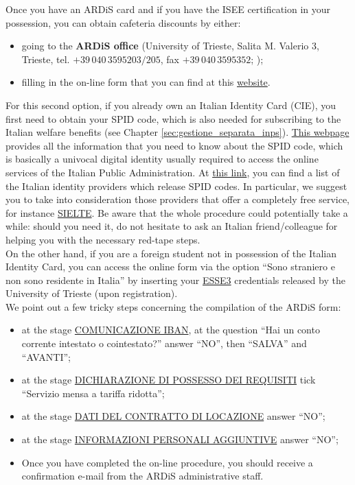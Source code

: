 \documentclass{sissavademecum}
\begin{document}
Once you have an ARDiS card and if you have the ISEE certification in your possession, you can obtain cafeteria discounts by either:
\begin{itemize}
    \item going to the \textbf{ARDiS office} (University of Trieste,
    Salita M. Valerio 3, Trieste, tel. $+39 \, 040 \,3595203/205$, fax $+39 \, 040 \, 3595352$;
    );
    \item filling in the on-line form that you can find at this \href{https://ardiss-sol.dirittoallostudio.it/apps/V3.1/sol/public/}{website}. 
\end{itemize}
For this second option, if you already own an Italian Identity Card (CIE), you first need to obtain your SPID code, which is also needed for subscribing to the Italian welfare benefits (see Chapter \ref{sec:gestione_separata_inps}). \href{https://www.spid.gov.it/en/}{This webpage} provides all the information that you need to know about the SPID code, which is basically a univocal digital identity usually required to access the online services of the Italian Public Administration. At \href{https://www.spid.gov.it/en/what-is-spid/how-to-choose-between-digital-identity-providers/}{this link}, you can find a list of the Italian identity providers which release SPID codes. In particular, we suggest you to take into consideration those providers that offer a completely free service, for instance \href{https://myid.sieltecloud.it/signup/}{SIELTE}. Be aware that the whole procedure could potentially take a while: should you need it, do not hesitate to ask an Italian friend/colleague for helping you with the necessary red-tape steps. \\
On the other hand, if you are a foreign student not in possession of the Italian Identity Card, you can access the online form via the option ``Sono straniero e non sono residente in Italia'' by inserting your \href{https://esse3.units.it/Home.do;jsessionid=D45A69198D3F77C3C4C108114BD43A50.esse3-units-prod-03?cod_lingua=eng}{ESSE3} credentials released by the University of Trieste (upon registration). \\
We point out a few tricky steps concerning the compilation of the ARDiS form:
\begin{itemize}
    \item at the stage \underline{COMUNICAZIONE IBAN}, at the question ``Hai un conto corrente intestato o cointestato?'' answer ``NO'', then ``SALVA'' and ``AVANTI'';
    \item at the stage \underline{DICHIARAZIONE DI POSSESSO DEI REQUISITI} tick ``Servizio mensa a tariffa ridotta'';
    \item at the stage \underline{DATI DEL CONTRATTO DI LOCAZIONE} answer ``NO'';
    \item at the stage \underline{INFORMAZIONI PERSONALI AGGIUNTIVE} answer ``NO'';
    \item Once you have completed the on-line procedure, you should receive a confirmation e-mail from the ARDiS administrative staff.
\end{itemize}
\end{document}
